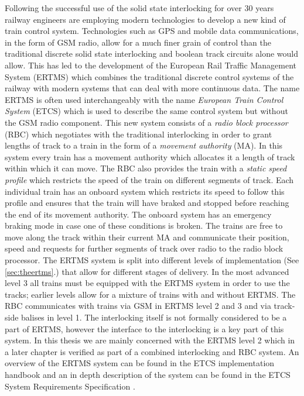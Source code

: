 \label{chapter:ERTMS}

Following the successful use of the solid state interlocking for over 30 years railway engineers are  employing modern technologies to develop a new kind of train control system.  Technologies such as GPS and mobile data communications, in the form of GSM radio,  allow for  a much finer grain of control than the traditional discrete solid state interlocking and  boolean track circuits alone would allow. 
This has led to the development of the European Rail Traffic Management System (ERTMS) which combines the traditional discrete control systems of the railway with modern systems that can deal with more continuous data. The name ERTMS is often used interchangeably with the name \emph{European Train Control System} (ETCS) which is used to describe the same control system but without the GSM radio component. This new system consists of a \emph{radio block processor} (RBC) which negotiates with the traditional interlocking in order to grant lengths of track to a train in the form of a \emph{movement authority} (MA). In this system every train has a movement authority which allocates it a length of track within which it can move. The RBC also provides the train with a \emph{static speed profile} which restricts the speed of the train on different segments of track. Each individual train has an onboard system which restricts its speed to follow this profile and ensures that the train will have braked and stopped before reaching the end of its movement authority. The onboard system has an emergency braking mode in case one of these conditions is broken. The trains are free to move along the  track within their current MA and communicate their position, speed and requests for further segments of track over radio to the radio block processor. The ERTMS system is split into different levels of implementation (See \ref{sec:theertms}.) that allow for different stages of delivery. In the most advanced level 3 all trains must be equipped with the ERTMS system in order to use the tracks; earlier levels allow for a mixture of trains with and without ERTMS. The RBC communicates with trains via GSM in ERTMS level 2 and 3 and via track-side balises in level 1. The interlocking itself is not formally considered to be a part of ERTMS, however the interface to the interlocking is a key part of this system. In this thesis we are mainly concerned with the ERTMS level 2 which in a later chapter is verified as part of a combined interlocking and RBC system. An overview of the ERTMS system can be found in the ETCS implementation handbook \cite{ETCSHB} and an in depth description of the system can be found in the ETCS System Requirements Specification \cite{ETCSSRS}.


